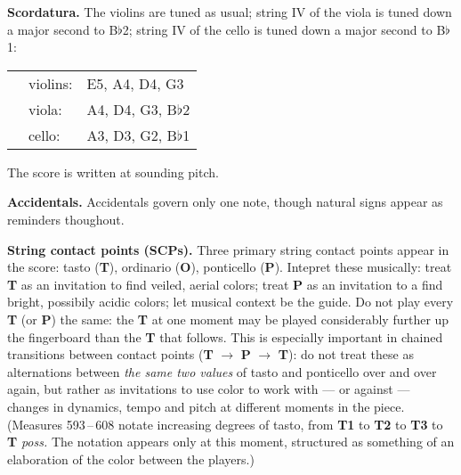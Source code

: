 \textbf{Scordatura.} The violins are tuned as usual; string IV of the viola is tuned down
a major second to B$\flat$2; string IV of the cello is tuned down a major second to
B$\flat$1:

\begin{tabu}{l l l}
\phantom{M} & violins: & E5, A4, D4, G3 \\
            & viola: & A4, D4, G3, B$\flat$2 \\
            & cello: & A3, D3, G2, B$\flat$1 \\
\end{tabu}

The score is written at sounding pitch.

\textbf{Accidentals.} Accidentals govern only one note, though natural signs appear as
reminders thoughout.

\textbf{String contact points (SCPs).} Three primary string contact points appear in the
score: tasto (\textbf{T}), ordinario (\textbf{O}), ponticello (\textbf{P}). Intepret
these musically: treat \textbf{T} as an invitation to find veiled, aerial colors; treat
\textbf{P} as an invitation to a find bright, possibily acidic colors; let musical
context be the guide. Do not play every \textbf{T} (or \textbf{P}) the same: the
\textbf{T} at one moment may be played considerably further up the fingerboard than the
\textbf{T} that follows. This is especially important in chained transitions between
contact points (\textbf{T} $\longrightarrow$ \textbf{P} $\longrightarrow$ \textbf{T}): do
not treat these as alternations between \textit{the same two values} of tasto and
ponticello over and over again, but rather as invitations to use color to work with ---
or against --- changes in dynamics, tempo and pitch at different moments in the piece.
(Measures 593\,--\,608 notate increasing degrees of tasto, from \textbf{T1} to
\textbf{T2} to \textbf{T3} to \textbf{T} \textit{poss.} The notation appears only at this
moment, structured as something of an elaboration of the color between the players.)

